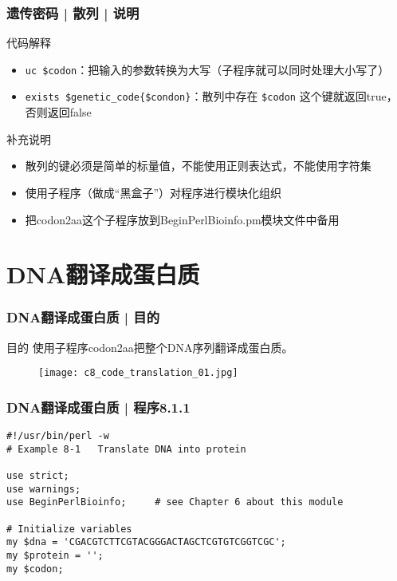 \begin{frame}[fragile]
  \frametitle{遗传密码 | 散列 | \alert{说明}}
  \begin{block}{代码解释}
  \begin{itemize}
    \item \verb|uc $codon|：把输入的参数转换为大写（子程序就可以同时处理大小写了）
    \item \verb|exists $genetic_code{$condon}|：散列中存在 \verb|$codon| 这个键就返回true，否则返回false
  \end{itemize}
  \end{block}
  \pause
  \begin{block}{补充说明}
    \begin{itemize}
      \item 散列的键必须是简单的标量值，不能使用正则表达式，不能使用字符集
      \item 使用子程序（做成“黑盒子”）对程序进行模块化组织
      \item 把codon2aa这个子程序放到BeginPerlBioinfo.pm模块文件中备用
    \end{itemize}
  \end{block}
\end{frame}

\section{DNA翻译成蛋白质}
\begin{frame}
  \frametitle{DNA翻译成蛋白质 | 目的}
  \begin{block}{目的}
    使用子程序codon2aa把整个DNA序列翻译成蛋白质。
  \end{block}
  \begin{figure}
    \centering
    \texttt{[image: c8\_code\_translation\_01.jpg]}
  \end{figure}
\end{frame}

\begin{frame}[fragile]
  \frametitle{DNA翻译成蛋白质 | 程序8.1.1}
\begin{lstlisting}[firstnumber=1]
#!/usr/bin/perl -w
# Example 8-1   Translate DNA into protein

use strict;
use warnings;
use BeginPerlBioinfo;     # see Chapter 6 about this module

# Initialize variables
my $dna = 'CGACGTCTTCGTACGGGACTAGCTCGTGTCGGTCGC';
my $protein = '';
my $codon;
\end{lstlisting}
\end{frame}

